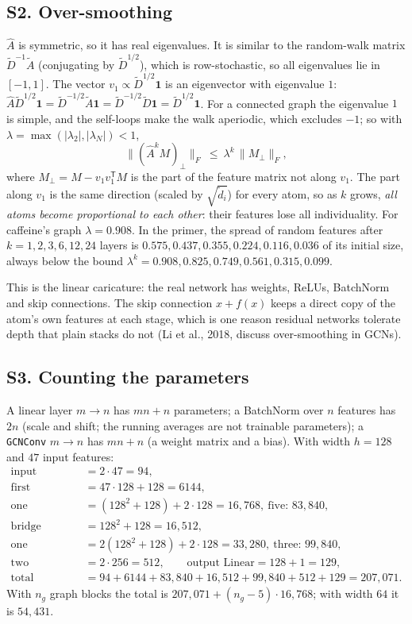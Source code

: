 \documentclass[11pt]{article}
\newcommand{\T}{\mathsf{T}}
\newcommand{\Ah}{\hat{A}}
\newcommand{\At}{\tilde{A}}
\newcommand{\Dt}{\tilde{D}}
\begin{document}
\label{sec:S2}
\subsection*{S2. Over-smoothing}
$\Ah$ is symmetric, so it has real eigenvalues. It is similar to the random-walk matrix $\Dt^{-1}\At$ (conjugating by $\Dt^{1/2}$), which is row-stochastic, so all eigenvalues lie in $[-1,1]$. The vector $v_1\propto\Dt^{1/2}\mathbf 1$ is an eigenvector with eigenvalue $1$: $\Ah\Dt^{1/2}\mathbf 1=\Dt^{-1/2}\At\mathbf 1=\Dt^{-1/2}\Dt\mathbf 1=\Dt^{1/2}\mathbf 1$. For a connected graph the eigenvalue $1$ is simple, and the self-loops make the walk aperiodic, which excludes $-1$; so with $\lambda=\max(|\lambda_2|,|\lambda_N|)<1$,
\[
  \big\lVert(\Ah^k M)_\perp\big\rVert_F\ \le\ \lambda^k\,\big\lVert M_\perp\big\rVert_F,
\]
where $M_\perp=M-v_1v_1^{\T}M$ is the part of the feature matrix not along $v_1$. The part along $v_1$ is the same direction (scaled by $\sqrt{\tilde d_i}$) for every atom, so as $k$ grows, \emph{all atoms become proportional to each other}: their features lose all individuality. For caffeine's graph $\lambda=0.908$. In the primer, the spread of random features after $k=1,2,3,6,12,24$ layers is $0.575,0.437,0.355,0.224,0.116,0.036$ of its initial size, always below the bound $\lambda^k=0.908,0.825,0.749,0.561,0.315,0.099$.

This is the linear caricature: the real network has weights, ReLUs, BatchNorm and skip connections. The skip connection $x+f(x)$ keeps a direct copy of the atom's own features at each stage, which is one reason residual networks tolerate depth that plain stacks do not (Li et al., 2018, discuss over-smoothing in GCNs).

\label{sec:S3}
\subsection*{S3. Counting the parameters}
A linear layer $m\to n$ has $mn+n$ parameters; a BatchNorm over $n$ features has $2n$ (scale and shift; the running averages are not trainable parameters); a \texttt{GCNConv} $m\to n$ has $mn+n$ (a weight matrix and a bias). With width $h=128$ and $47$ input features:
\begin{align*}
  \text{input BatchNorm}&=2\cdot47=94,\\
  \text{first GCNConv}&=47\cdot128+128=6144,\\
  \text{one ResGraph}&=(128^2+128)+2\cdot128=16{,}768,\ \text{five: }83{,}840,\\
  \text{bridge Linear}&=128^2+128=16{,}512,\\
  \text{one ResBlock}&=2(128^2+128)+2\cdot128=33{,}280,\ \text{three: }99{,}840,\\
  \text{two BatchNorms}&=2\cdot256=512,\qquad
  \text{output Linear}=128+1=129,\\
  \text{total}&=94+6144+83{,}840+16{,}512+99{,}840+512+129=207{,}071 .
\end{align*}
With $n_g$ graph blocks the total is $207{,}071+(n_g-5)\cdot16{,}768$; with width $64$ it is $54{,}431$.
\end{document}

